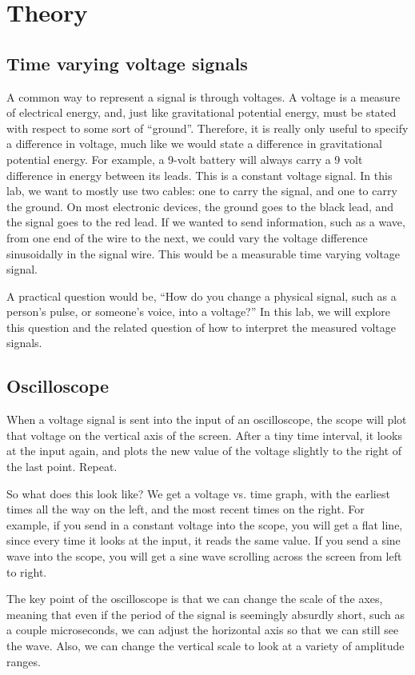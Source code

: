 \section{Theory}
\subsection{Time varying voltage signals}
A common way to represent a signal is through voltages. A voltage is a measure of electrical energy, and, just like gravitational potential energy, must be stated with respect to some sort of ``ground''. Therefore, it is really only useful to specify a difference in voltage, much like we would state a difference in gravitational potential energy. For example, a 9-volt battery will always carry a 9 volt difference in energy between its leads. This is a constant voltage signal. In this lab, we want to mostly use two cables: one to carry the signal, and one to carry the ground. On most electronic devices, the ground goes to the black lead, and the signal goes to the red lead. If we wanted to send information, such as a wave, from one end of the wire to the next, we could vary the voltage difference sinusoidally in the signal wire. This would be a measurable time varying voltage signal.\myskip

A practical question would be, ``How do you change a physical signal, such as a person's pulse, or someone's voice, into a voltage?'' In this lab, we will explore this question and the related question of how to interpret the measured voltage signals.


\subsection{Oscilloscope}
When a voltage signal is sent into the input of an oscilloscope, the scope will plot that voltage on the vertical axis of the screen. After a tiny time interval, it looks at the input again, and plots the new value of the voltage slightly to the right of the last point. Repeat.\myskip

So what does this look like? We get a voltage vs. time graph, with the earliest times all the way on the left, and the most recent times on the right. For example, if you send in a constant voltage into the scope, you will get a flat line, since every time it looks at the input, it reads the same value. If you send a sine wave into the scope, you will get a sine wave scrolling across the screen from left to right.\myskip

The key point of the oscilloscope is that we can change the scale of the axes, meaning that even if the period of the signal is seemingly absurdly short, such as a couple microseconds, we can adjust the horizontal axis so that we can still see the wave. Also, we can change the vertical scale to look at a variety of amplitude ranges.\myskip

